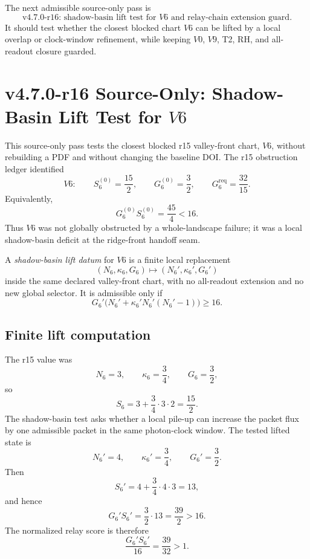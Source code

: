 \begin{corollary}
\label{cor:v470-r15-permitted-r16-direction}
The next admissible source-only pass is
\[
\text{v4.7.0-r16: shadow-basin lift test for }V6
\text{ and relay-chain extension guard.}
\]
It should test whether the closest blocked chart \(V6\) can be lifted by a
local overlap or clock-window refinement, while keeping \(V0\), \(V9\), T2, RH,
and all-readout closure guarded.
\end{corollary}

\section{v4.7.0-r16 Source-Only: Shadow-Basin Lift Test for \texorpdfstring{$V6$}{V6}}
\label{sec:v470-r16-shadow-basin-lift-v6}

This source-only pass tests the closest blocked r15 valley-front chart,
\(V6\), without rebuilding a PDF and without changing the baseline DOI.  The
r15 obstruction ledger identified
\[
V6:
\qquad
S_6^{(0)}=\frac{15}{2},
\qquad
G_6^{(0)}=\frac{3}{2},
\qquad
G_6^{\mathrm{req}}=\frac{32}{15}.
\]
Equivalently,
\[
G_6^{(0)}S_6^{(0)}
=
\frac{45}{4}
<16.
\]
Thus \(V6\) was not globally obstructed by a whole-landscape failure; it was a
local shadow-basin deficit at the ridge-front handoff seam.

\begin{definition}
\label{def:v470-r16-shadow-basin-lift-datum-v6}
A \emph{shadow-basin lift datum} for \(V6\) is a finite local replacement
\[
(N_6,\kappa_6,G_6)
\longmapsto
(N_6',\kappa_6',G_6')
\]
inside the same declared valley-front chart, with no all-readout extension and
no new global selector.  It is admissible only if
\[
G_6'\bigl(N_6'+\kappa_6'N_6'(N_6'-1)\bigr)\geq 16.
\]
\end{definition}

\subsection{Finite lift computation}
\label{subsec:v470-r16-finite-lift-computation}

The r15 value was
\[
N_6=3,
\qquad
\kappa_6=\frac34,
\qquad
G_6=\frac32,
\]
so
\[
S_6
=
3+\frac34\cdot 3\cdot 2
=
\frac{15}{2}.
\]
The shadow-basin test asks whether a local pile-up can increase the packet flux
by one admissible packet in the same photon-clock window.  The tested lifted
state is
\[
N_6'=4,
\qquad
\kappa_6'=\frac34,
\qquad
G_6'=\frac32.
\]
Then
\[
S_6'
=
4+\frac34\cdot4\cdot3
=13,
\]
and hence
\[
G_6'S_6'
=
\frac32\cdot13
=
\frac{39}{2}
>
16.
\]
The normalized relay score is therefore
\[
\frac{G_6'S_6'}{16}
=
\frac{39}{32}
>1.
\]

